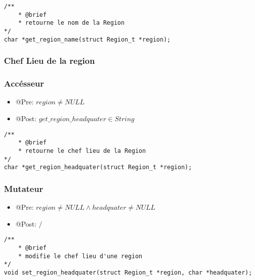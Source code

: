 \begin{lstlisting}
/**
    * @brief 
    * retourne le nom de la Region
*/
char *get_region_name(struct Region_t *region);
\end{lstlisting}


\subsubsection{Chef Lieu de la region}

\subsubsection{Accésseur}

\begin{itemize}
    \item @Pre: $region \ne NULL$
    \item @Post: $get\_region\_headquater \in String$ 
\end{itemize}

\begin{lstlisting}
/**
    * @brief 
    * retourne le chef lieu de la Region
*/
char *get_region_headquater(struct Region_t *region);
\end{lstlisting}

\subsubsection{Mutateur}

\begin{itemize}
    \item @Pre: $region \ne NULL \land headquater \ne NULL$
    \item @Post: $\slash$
\end{itemize}

\begin{lstlisting}
/**
    * @brief 
    * modifie le chef lieu d'une region
*/
void set_region_headquater(struct Region_t *region, char *headquater);
\end{lstlisting}


